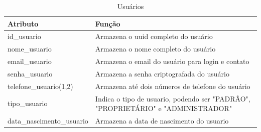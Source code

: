 \begin{table}[htbp]
    \centering
    \caption{Usuários}
    \begin{tabular}{|p{5cm}|p{10cm}|} 
        \hline
        \textbf{Atributo} & \textbf{Função} \\
        \hline
        id\_usuario & Armazena o uuid completo do usuário \\ 
        \hline
        nome\_usuario & Armazena o nome completo do usuário \\ 
        \hline
        email\_usuario & Armazena o email do usuário para login e contato \\ 
        \hline
        senha\_usuario & Armazena a senha criptografada do usuário \\ 
        \hline
        telefone\_usuario(1,2) & Armazena até dois números de telefone do usuário \\ 
        \hline
        tipo\_usuario & Indica o tipo de usuario, podendo ser "PADRÃO", "PROPRIETÁRIO" e "ADMINISTRADOR" \\ 
        \hline
        data\_nascimento\_usuario & Armazena a data de nascimento do usuario \\ 
        \hline
    \end{tabular}
    \label{tab:usuarios}
\end{table}
\newpage
